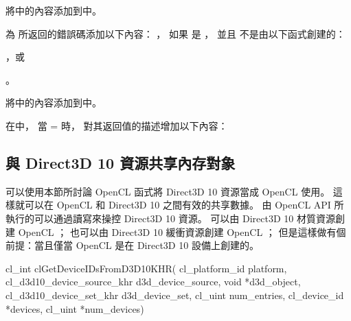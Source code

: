 將中的內容添加到中。

{}

為  所返回的錯誤碼添加以下內容：
\startreplacepar
\startigBase
\startitem
{}，
如果  是 ，
並且  不是由以下函式創建的：
\startigBase
\item {}，或
\item {}。
\stopigBase
\stopitem
\stopigBase
\stopreplacepar

將中的內容添加到中。

{}

在中，
當  =  時，
對其返回值的描述增加以下內容：
\startreplacepar
\startigBase
\item {}
\item {}
\stopigBase
\stopreplacepar

\subsection{與 Direct3D 10 資源共享內存對象}

可以使用本節所討論 OpenCL 函式將 Direct3D 10 資源當成 OpenCL 使用。
這樣就可以在 OpenCL 和 Direct3D 10 之間有效的共享數據。
由 OpenCL API 所執行的可以通過讀寫來操控 Direct3D 10 資源。
可以由 Direct3D 10 材質資源創建 OpenCL ；
也可以由 Direct3D 10 緩衝資源創建 OpenCL ；
但是這樣做有個前提：當且僅當 OpenCL 是在 Direct3D 10 設備上創建的。


\startCLFUNC
cl_int clGetDeviceIDsFromD3D10KHR(
		cl_platform_id platform,
		cl_d3d10_device_source_khr d3d_device_source,
		void *d3d_object,
		cl_d3d10_device_set_khr d3d_device_set,
		cl_uint num_entries,
		cl_device_id *devices,
		cl_uint *num_devices)
\stopCLFUNC

